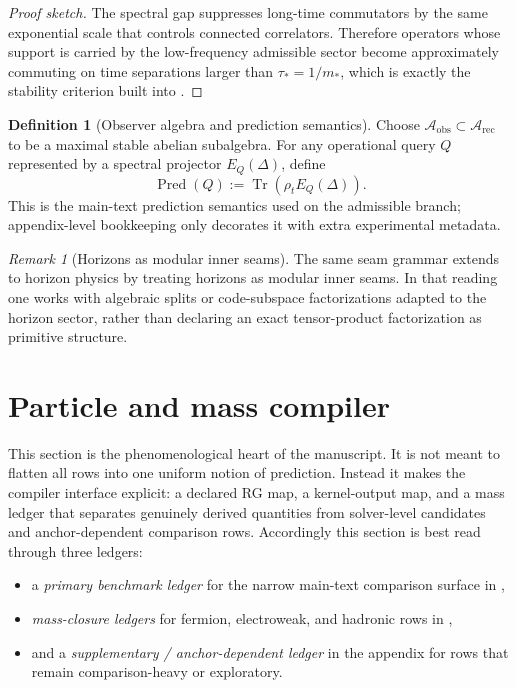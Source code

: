 \documentclass[11pt,a4paper]{article}
\theoremstyle{definition}
\newtheorem{definition}[theorem]{Definition}
\theoremstyle{remark}
\newtheorem*{remark}{Remark}
\DeclareMathOperator{\tr}{Tr}
\newcommand{\Arec}{\mathcal A_{\mathrm{rec}}}
\newcommand{\Aobs}{\mathcal A_{\mathrm{obs}}}
\newcommand{\Pred}{\operatorname{Pred}}
\begin{document}
\begin{proof}[Proof sketch]
The spectral gap suppresses long-time commutators by the same exponential scale that controls connected correlators. Therefore operators whose support is carried by the low-frequency admissible sector become approximately commuting on time separations larger than $\tau_*=1/m_*$, which is exactly the stability criterion built into .
\end{proof}

\begin{definition}[Observer algebra and prediction semantics]
\label{def:observer-algebra-prediction}
Choose $\Aobs\subset\Arec$ to be a maximal stable abelian subalgebra. For any operational query $Q$ represented by a spectral projector $E_Q(\Delta)$, define
\[
\Pred(Q):=\tr(\rho_tE_Q(\Delta)).
\]
This is the main-text prediction semantics used on the admissible branch; appendix-level bookkeeping only decorates it with extra experimental metadata.
\end{definition}

\begin{remark}[Horizons as modular inner seams]
The same seam grammar extends to horizon physics by treating horizons as modular inner seams. In that reading one works with algebraic splits or code-subspace factorizations adapted to the horizon sector, rather than declaring an exact tensor-product factorization as primitive structure.
\end{remark}

\section{Particle and mass compiler}

This section is the phenomenological heart of the manuscript. It is not meant to flatten all rows into one uniform notion of prediction. Instead it makes the compiler interface explicit: a declared RG map, a kernel-output map, and a mass ledger that separates genuinely derived quantities from solver-level candidates and anchor-dependent comparison rows.
Accordingly this section is best read through three ledgers:
\begin{itemize}[leftmargin=1.5em, topsep=3pt, itemsep=2pt]
    \item a \emph{primary benchmark ledger} for the narrow main-text comparison surface in ,
    \item \emph{mass-closure ledgers} for fermion, electroweak, and hadronic rows in ,
    \item and a \emph{supplementary / anchor-dependent ledger} in the appendix for rows that remain comparison-heavy or exploratory.
\end{itemize}
\end{document}
